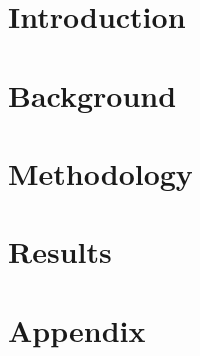 \chapter{Introduction}






\chapter{Background}







\chapter{Methodology}




\chapter{Results}















\chapter{Appendix}


